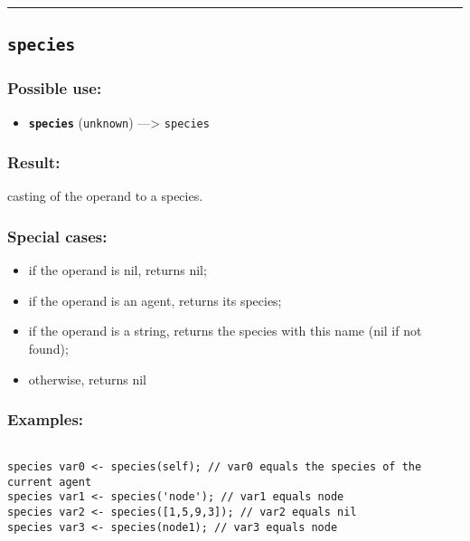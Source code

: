\documentclass[]{book}
\providecommand{\tightlist}{%
  \setlength{\itemsep}{0pt}\setlength{\parskip}{0pt}}
\theoremstyle{definition}
\theoremstyle{definition}
\theoremstyle{definition}
\theoremstyle{remark}
\begin{document}
\begin{center}\rule{0.5\linewidth}{\linethickness}\end{center}

\subsection{\texorpdfstring{\texttt{species}}{species}}\label{species}

\subsubsection{Possible use:}\label{possible-use-489}

\begin{itemize}
\tightlist
\item
  \textbf{\texttt{species}} (\texttt{unknown}) ---\textgreater{}
  \texttt{species}
\end{itemize}

\subsubsection{Result:}\label{result-473}

casting of the operand to a species.

\subsubsection{Special cases:}\label{special-cases-126}

\begin{itemize}
\tightlist
\item
  if the operand is nil, returns nil;\\
\item
  if the operand is an agent, returns its species;\\
\item
  if the operand is a string, returns the species with this name (nil if
  not found);\\
\item
  otherwise, returns nil
\end{itemize}

\subsubsection{Examples:}\label{examples-341}

\begin{verbatim}
 
species var0 <- species(self); // var0 equals the species of the current agent 
species var1 <- species('node'); // var1 equals node 
species var2 <- species([1,5,9,3]); // var2 equals nil 
species var3 <- species(node1); // var3 equals node
\end{verbatim}
\end{document}
